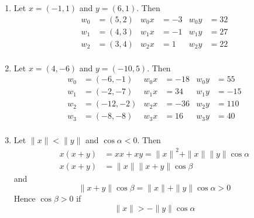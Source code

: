 \begin{examples}
    \hfill
    \begin{enumerate}
        \item Let \( x = (-1, 1) \) and \( y = (6, 1) \). Then
              \[
                  \begin{aligned}
                      w_0 & = (5, 2) & w_0x & = -3 & w_0y & = 32 \\
                      w_1 & = (4, 3) & w_1x & = -1 & w_1y & = 27 \\
                      w_2 & = (3, 4) & w_2x & = 1  & w_2y & = 22 \\
                  \end{aligned}
              \]
        \item Let \( x = (4, -6) \) and \( y = (-10, 5) \). Then
              \[
                  \begin{aligned}
                      w_0 & = (-6, -1)  & w_0x & = -18 & w_0y & = 55  \\
                      w_1 & = (-2, -7)  & w_1x & = 34  & w_1y & = -15 \\
                      w_2 & = (-12, -2) & w_2x & = -36 & w_2y & = 110 \\
                      w_3 & = (-8, -8)  & w_3x & = 16  & w_3y & = 40  \\
                  \end{aligned}
              \]
        \item Let \( \|x\| < \|y\| \) and \( \cos\alpha < 0 \). Then
              \[
                  \begin{split}
                      x(x + y) & = xx + xy = {\|x\|}^2 + \|x\| \|y\| \cos\alpha \\
                      x(x + y) & = \|x\| \|x + y\| \cos\beta
                  \end{split}
              \]
              and
              \[
                  {\|x + y\|}\cos\beta = \|x\| + \|y\|\cos\alpha > 0
              \]
              Hence \( \cos\beta > 0 \) if
              \[
                  \|x\| > -\|y\|\cos\alpha
              \] 
    \end{enumerate}
\end{examples}
\bigskip

\begin{algorithm}[Weight]\label{algo:weight}
\end{algorithm}
\inputminted[fontsize=\small, framesep=0.35cm, frame=lines, python3=true]{python}{python/weight.py}
\bigskip



